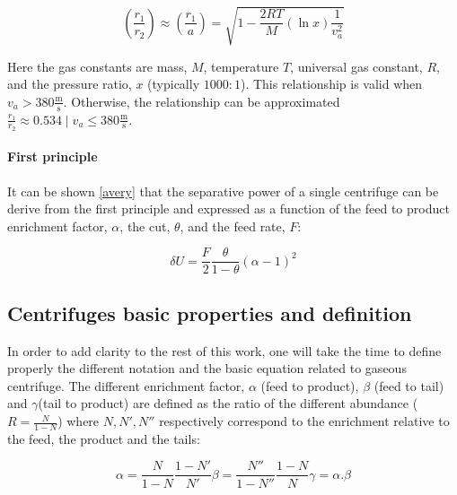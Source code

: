 \begin{equation}
    (\frac{r_1}{r_2}) \approx (\frac{r_1}{a}) = \sqrt{1 - \frac{2RT}{M}(\ln x)\frac{1}{v_{a}^{2}}}
\end{equation}

Here the gas constants are mass, $M$, temperature $T$, universal gas constant, $R$,
and the pressure ratio, $x$ (typically $1000:1$).
This relationship is valid when $v_a > 380 \frac{\mathrm{m}}{\mathrm{s}}$.
Otherwise, the relationship can be approximated ${\frac{r_1}{r_2} \approx 0.534 \mid v_a \leq 380} \frac{\mathrm{m}}{\mathrm{s}}$.

\paragraph{First principle}

It can be shown \ref{avery} that the separative power of a single centrifuge can be
derive from the first principle and expressed as a function of the feed to
product enrichment factor, $\alpha$, the cut, $\theta$, and the feed rate, $F$:

\begin{equation} \label{eq_alpha_principle}
    \delta U = \frac{F}{2}\frac{\theta}{1-\theta}(\alpha-1)^{2}
\end{equation}

\subsection{Centrifuges basic properties and definition}

In order to add clarity to the rest of this work, one will take the time to
define properly the different notation and the basic equation related to gaseous
centrifuge. The different enrichment factor, $\alpha$ (feed to product), $\beta$
(feed to tail) and $\gamma$(tail to product) are defined as the ratio of the
different abundance ($R = \frac{N}{1-N}$) where $N, N', N''$ respectively
correspond to the enrichment relative to the feed, the product and the tails:

\begin{subequations}
    \label{eq_alphabeta}
    \begin{equation} \label{eq_alpha_def}
        \alpha = \frac{N}{1-N}\frac{1-N'}{N'}
    \end{equation}
    \begin{equation}\label{eq_beta-def}
        \beta = \frac{N''}{1-N''}\frac{1-N}{N}
    \end{equation}
    \begin{equation}\label{eq_gamma-def}
        \gamma = \alpha.\beta
    \end{equation}
\end{subequations}



